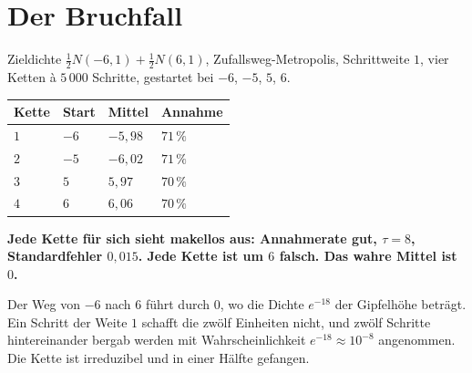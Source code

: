 \section{Der Bruchfall}

\begin{warnung}
Zieldichte $\tfrac12 N(-6,1) + \tfrac12 N(6,1)$, Zufallsweg-Metropolis, Schrittweite $1$, vier Ketten à $5\,000$ Schritte, gestartet bei $-6$, $-5$, $5$, $6$.

\begin{center}
{\small
\renewcommand{\arraystretch}{1.48}
\begin{tabular}{@{}P{1.4cm}P{2.0cm}P{2.0cm}P{2.6cm}@{}}
\toprule
\textbf{Kette} & \textbf{Start} & \textbf{Mittel} & \textbf{Annahme}\\
\midrule
$1$ & $-6$ & $-5{,}98$ & $71\,\%$\\
$2$ & $-5$ & $-6{,}02$ & $71\,\%$\\
$3$ & $5$ & $5{,}97$ & $70\,\%$\\
$4$ & $6$ & $6{,}06$ & $70\,\%$\\
\bottomrule
\end{tabular}}
\end{center}

\begin{center}
\begin{minipage}{0.9\textwidth}
\textbf{Jede Kette für sich sieht makellos aus: Annahmerate gut, $\tau = 8$, Standardfehler $0{,}015$. Jede Kette ist um $6$ falsch. Das wahre Mittel ist $0$.}
\end{minipage}
\end{center}

Der Weg von $-6$ nach $6$ führt durch $0$, wo die Dichte $e^{-18}$ der Gipfelhöhe beträgt. Ein Schritt der Weite $1$ schafft die zwölf Einheiten nicht, und zwölf Schritte hintereinander bergab werden mit Wahrscheinlichkeit $e^{-18}\approx10^{-8}$ angenommen. Die Kette ist  irreduzibel und  in einer Hälfte gefangen.

\begin{center}
\begin{minipage}{0.88\textwidth}
\end{minipage}
\end{center}
\end{warnung}

